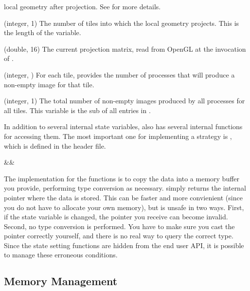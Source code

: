 \begin{Description}[xxxxxxxx]
  local geometry after projection.  See 
  for more details.
\item[\CEnum{ICET\_NUM\_CONTAINED\_TILES}] (integer, 1) The number of tiles
  into which the local geometry projects.  This is the length of the
   variable.
\item[\CEnum{ICET\_PROJECTION\_MATRIX}] (double, 16) The current projection
  matrix, read from OpenGL at the invocation of .
\item[\CEnum{ICET\_TILE\_CONTRIB\_COUNTS}] (integer,
  ) For each tile, provides the number of processes
  that will produce a non-empty image for that tile.
\item[\CEnum{ICET\_TOTAL\_IMAGE\_COUNT}] (integer, 1) The total number of
  non-empty images produced by all processes for all tiles.  This variable
  is the sub of all entries in .
\end{Description}

\label{manpage:icetUnsafeStateGet}
In addition to several internal state variables, \IceT also has several
internal functions for accessing them.  The most important one for
implementing a strategy is , which is defined in
the  header file.

\begin{Table}{3}
  \textC{(}&&\quad\textC{);}
\end{Table}

The implementation for the  functions is to copy the data
into a memory buffer you provide, performing type conversion as necessary.
 simply returns the internal pointer where the
data is stored.  This can be faster and more convienient (since you do not
have to allocate your own memory), but is unsafe in two ways.  First, if
the state variable is changed, the pointer you receive can become invalid.
Second, no type conversion is performed.  You have to make sure you cast
the pointer correctly yourself, and there is no real way to query the
correct type.  Since the state setting functions are hidden from the end
user API, it is possible to manage these erroneous conditions.

\subsection{Memory Management}

